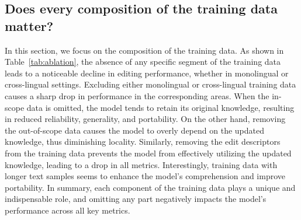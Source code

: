 \subsection{Does every composition of the training data matter?}
In this section, we focus on the composition of the training data. As shown in Table~\ref{tab:ablation}, the absence of any specific segment of the training data leads to a noticeable decline in editing performance, whether in monolingual or cross-lingual settings.
Excluding either monolingual or cross-lingual training data causes a sharp drop in performance in the corresponding areas. When the in-scope data is omitted, the model tends to retain its original knowledge, resulting in reduced reliability, generality, and portability. On the other hand, removing the out-of-scope data causes the model to overly depend on the updated knowledge, thus diminishing locality. Similarly, removing the edit descriptors from the training data prevents the model from effectively utilizing the updated knowledge, leading to a drop in all metrics. Interestingly, training data with longer text samples seems to enhance the model’s comprehension and improve portability.
In summary, each component of the training data plays a unique and indispensable role, and omitting any part negatively impacts the model’s performance across all key metrics.


